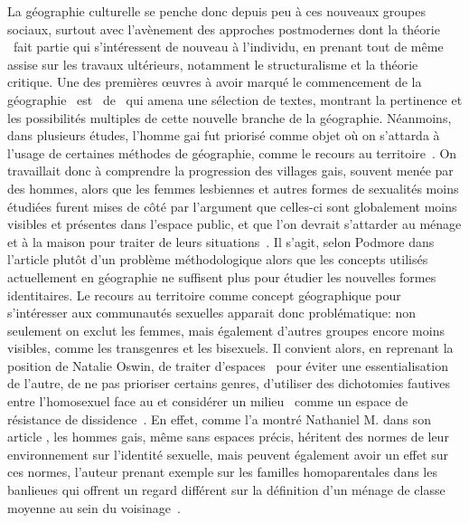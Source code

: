 La géographie culturelle se penche donc depuis peu à ces nouveaux groupes sociaux, surtout avec l'avènement des approches postmodernes dont la théorie \qu\ fait partie qui s'intéressent de nouveau à l'individu, en prenant tout de même assise sur les travaux ultérieurs, notamment le structuralisme et la théorie critique. 
Une des premières œuvres à avoir marqué le commencement de la géographie \qu\ est~ de~\citet{Bell1994} qui amena une sélection de textes, montrant la pertinence et les possibilités multiples de cette nouvelle branche de la géographie. 
Néanmoins, dans plusieurs études, l'homme gai fut priorisé comme objet où on s'attarda à l'usage de certaines méthodes de géographie, comme le recours au territoire~\citep{Podmore2001,Oswin2008}. 
On travaillait donc à comprendre la progression des villages gais, souvent menée par des hommes, alors que les femmes lesbiennes et autres formes de sexualités moins étudiées furent mises de côté par l'argument que celles-ci sont globalement moins visibles et présentes dans l'espace public, et que l'on devrait s'attarder au ménage et à la maison pour traiter de leurs situations~\citep[333-334]{Podmore2001}. 
Il s'agit, selon Podmore dans l'article  plutôt d'un problème méthodologique alors que les concepts utilisés actuellement en géographie ne suffisent plus pour étudier les nouvelles formes identitaires. 
Le recours au territoire comme concept géographique pour s'intéresser aux communautés sexuelles apparait donc problématique: non seulement on exclut les femmes, mais également d'autres groupes encore moins visibles, comme les transgenres et les bisexuels. 
Il convient alors, en reprenant la position de Natalie Oswin, de traiter d'espaces \qus\ pour éviter une essentialisation de l'autre, de ne pas prioriser certains genres, d'utiliser des dichotomies fautives entre l'homosexuel face au  et considérer  un milieu \qu\ comme un espace de résistance de dissidence~\citep{Oswin2008}. 
En effet, comme l'a montré Nathaniel M. \citet{Lewis2011} dans son article , les hommes gais, même sans espaces précis, héritent des normes de leur environnement sur l'identité sexuelle, mais peuvent également avoir un effet sur ces normes, l'auteur prenant exemple sur les familles homoparentales dans les banlieues qui offrent un regard différent sur la définition d'un ménage de classe moyenne au sein du voisinage~\citep[304]{Lewis2011}.

